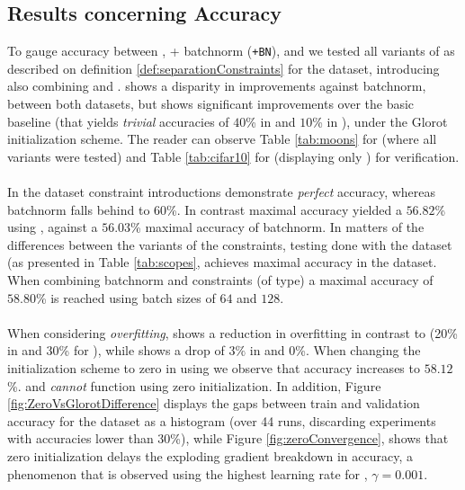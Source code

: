 \subsection{Results concerning Accuracy}\label{subsec:accuracyResults}
To gauge accuracy between \ReLU, \ReLU +  batchnorm (\texttt{\ReLU+BN}), and \SepUnit we tested all variants of \SepUnit as described on definition \ref{def:separationConstraints} for the \moons dataset, introducing also  \SepPointUnit combining \SepUnit and \SepPoint. \SepUnit shows a disparity in improvements against batchnorm, between both datasets, but shows significant improvements over the basic \ReLU baseline (that yields \emph{trivial} accuracies of $40$\% in \moons and $10$\% in \cifar), under the Glorot initialization scheme. The reader can observe Table \ref{tab:moons} for \moons (where all \SepConstraint variants were tested) and Table \ref{tab:cifar10} for \cifar (displaying only \SepLayer) for verification. 
\\\\
In the \moons dataset constraint introductions demonstrate \emph{perfect} accuracy, whereas batchnorm falls behind to $60$\%.  In contrast maximal \cifar accuracy yielded a $56.82$\% using \SepLayer, against a $56.03$\% maximal accuracy of batchnorm. In matters of the differences between the variants of the constraints, testing done with the \moons dataset (as presented in Table \ref{tab:scopes}, \SepLayer achieves maximal accuracy in the \moons dataset.  When combining batchnorm and constraints (of \SepLayer type) a maximal accuracy of $58.80$\% is reached using batch sizes of $64$ and $128$.  
\\\\
When considering \emph{overfitting}, \SepLayer shows a reduction in overfitting in contrast to \ReLUBN (20\% in \moons and 30\% for \cifar), while \SepLayer shows a drop of $3\%$ in \cifar and $0$\%. When changing the initialization scheme to zero in \cifar using \SepLayer we observe that accuracy increases to $58.12$\%. \ReLUBN and \ReLU \emph{cannot} function using zero initialization. In addition, Figure \ref{fig:ZeroVsGlorotDifference} displays the gaps between train and validation accuracy for the \cifar dataset as a histogram (over 44 runs, discarding experiments with accuracies lower than $30$\%), while Figure \ref{fig:zeroConvergence}, shows that zero initialization delays the exploding gradient breakdown in accuracy, a phenomenon that is observed using the highest learning rate for \cifar, $\gamma=0.001$. 
